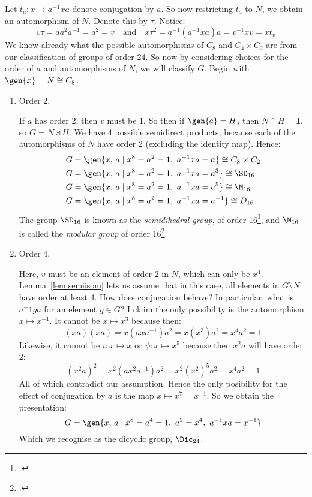 Let \(t_a:x \mapsto a^{-1}xa\) denote conjugation by \(a\).
So now restricting \(t_a\) to \(N\), we obtain an automorphism of \(N\).
Denote this by \(\tau\).
Notice:
\[v\tau = aa^2 a^{-1} = a^2 = v \quad \text{and} \quad x\tau^2 = a^{-1}(a^{-1}xa)a = v^{-1}xv = xt_v \tag{for all \(x \in
N\)}\]
We know already what the possible automorphisms of \(C_8\) and \(C_4 \times C_2\) are from our classification of groups
of order 24.
So now by considering choices for the order of \(a\) and automorphisms of \(N\), we will classify \(G\).
Begin with \(\gen{x} = N \cong C_8\).

\begin{enumerate}
    \item Order 2.

        If \(a\) has order 2, then \(v\) must be 1.
        So then if \(\gen{a} = H\), then \(N \cap H = \bm{1}\), so \(G = N \rtimes H\).
        We have 4 possible semidirect products, because each of the automorphisms of \(N\) have order 2 (excluding the
        identity map).
        Hence:
        \begin{align*}
        G &= \gen{x,\,a \mid x^8 = a^2 = 1,\ a^{-1}xa = a} \cong C_8 \times C_2 \\
        G &= \gen{x,\,a \mid x^8 = a^2 = 1,\ a^{-1}xa = a^{3}} \cong \SD_{16}\\
        G &= \gen{x,\,a \mid x^8 = a^2 = 1,\ a^{-1}xa = a^{5}} \cong \M_{16}\\
        G &= \gen{x,\,a \mid x^8 = a^2 = 1,\ a^{-1}xa = a^{-1}} \cong D_{16}
        \end{align*}
        The group \(\SD_{16}\) is known as the \emph{semidihedral group}, of order 16\footcite{semidihedral}, and
        \(\M_{16}\) is called the \emph{modular group} of order 16\footcite{order16names}.

    \item Order 4.

        Here, \(v\) must be an element of order 2 in \(N\), which can only be \(x^4\).
        Lemma~\ref{lem:semiisom} lets us assume that in this case, all elements in \(G\setminus N\) have order at least
        4.
        How does conjugation behave?
        In particular, what is \(a^-1ga\) for an element \(g \in G\)?
        I claim the only possibility is the automorphism \(x\mapsto x^{-1}\).
        It cannot be \(x\mapsto x^3\) because then:
        \[(xa)(xa) = x(axa^{-1})a^2 = x(x^3) a^2 = x^4 a^2 = 1\]
        Likewise, it cannot be \(\iota:x\mapsto x\) or \(\psi:x\mapsto x^5\) because then \(x^2 a\) will have order 2:
        \[{(x^2 a)}^2 = x^2 (ax^2 a^{-1})a^2 = x^2 {(x^2)}^5 a^2 = x^4 a^2 = 1\]
        All of which contradict our assumption.
        Hence the only posibility for the effect of conjugation by \(a\) is the map \(x\mapsto x^7 = x^{-1}\).
        So we obtain the presentation:
        \[G = \gen{x,\,a \mid x^8 = a^4 = 1,\ a^2 = x^4,\ a^{-1}xa = x^{-1}}\]
        Which we recognise as the dicyclic group, \(\Dic_{24}\).


\end{enumerate}
